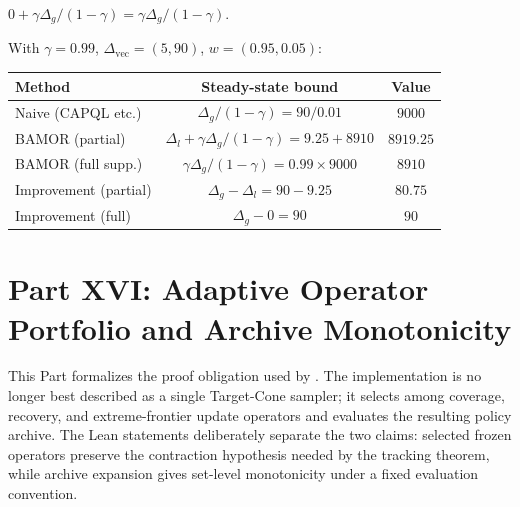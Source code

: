 \begin{corollary}
$0 + \gamma\Delta_g/(1{-}\gamma) = \gamma\Delta_g/(1{-}\gamma)$.
\end{corollary}

\begin{example}
\label{ex:numerical}
With $\gamma = 0.99$, $\Delta_{\mathrm{vec}} = (5, 90)$, $w = (0.95, 0.05)$:
\begin{center}
\begin{tabular}{lcc}
\toprule
\textbf{Method} & \textbf{Steady-state bound} & \textbf{Value} \\
\midrule
Naive (CAPQL etc.) & $\Delta_g/(1{-}\gamma) = 90/0.01$ & $9000$ \\
BAMOR (partial) & $\Delta_l + \gamma\Delta_g/(1{-}\gamma) = 9.25 + 8910$ & $8919.25$ \\
BAMOR (full supp.) & $\gamma\Delta_g/(1{-}\gamma) = 0.99 \times 9000$ & $8910$ \\
\midrule
Improvement (partial) & $\Delta_g - \Delta_l = 90 - 9.25$ & $80.75$ \\
Improvement (full) & $\Delta_g - 0 = 90$ & $90$ \\
\bottomrule
\end{tabular}
\end{center}
\end{example}


\section{Part XVI: Adaptive Operator Portfolio and Archive Monotonicity}
\label{app:portfolio_archive}

This Part formalizes the proof obligation used by \bamorv{}.  The implementation is no longer best described as a single Target-Cone sampler; it selects among coverage, recovery, and extreme-frontier update operators and evaluates the resulting policy archive.  The Lean statements deliberately separate the two claims: selected frozen operators preserve the contraction hypothesis needed by the tracking theorem, while archive expansion gives set-level monotonicity under a fixed evaluation convention.

